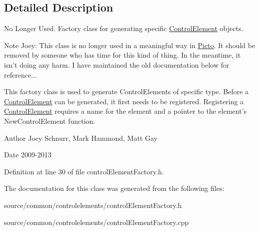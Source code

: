\subsection{Detailed Description}
No Longer Used. Factory class for generating specific \hyperlink{class_picto_1_1_control_element}{Control\-Element} objects. 

\begin{DoxyNote}{Note}
Joey\-: This class is no longer used in a meaningful way in \hyperlink{namespace_picto}{Picto}. It should be removed by someone who has time for this kind of thing. In the meantime, it isn't doing any harm. I have maintained the old documentation below for reference...
\end{DoxyNote}
This factory class is used to generate Control\-Elements of specific type. Before a \hyperlink{class_picto_1_1_control_element}{Control\-Element} can be generated, it first needs to be registered. Registering a \hyperlink{class_picto_1_1_control_element}{Control\-Element} requires a name for the element and a pointer to the element's New\-Control\-Element function.

\begin{DoxyAuthor}{Author}
Joey Schnurr, Mark Hammond, Matt Gay 
\end{DoxyAuthor}
\begin{DoxyDate}{Date}
2009-\/2013 
\end{DoxyDate}


Definition at line 30 of file control\-Element\-Factory.\-h.



The documentation for this class was generated from the following files\-:\begin{DoxyCompactItemize}
\item 
source/common/controlelements/control\-Element\-Factory.\-h\item 
source/common/controlelements/control\-Element\-Factory.\-cpp\end{DoxyCompactItemize}
